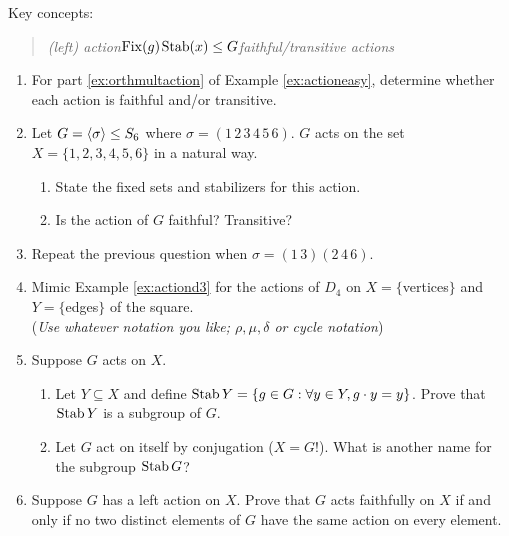 

\begin{exercises}{}{}
	Key concepts:
	\begin{quote}
		\emph{(left) action\quad $\operatorname{Fix}(g)$\quad $\operatorname{Stab}(x)\le G$\quad faithful/transitive actions}
	\end{quote}
	
	\begin{enumerate}
	  \item For part \ref*{ex:orthmultaction} of Example \ref{ex:actioneasy}, determine whether each action is faithful and/or transitive.
	
		
		\item\label{exs:orbitsigma1} Let $G=\left\langle \sigma\right\rangle\le S_6$ where $\sigma=(1\,2\,3\,4\,5\,6)$. $G$ acts on the set $X=\{1,2,3,4,5,6\}$ in a natural way.
		\begin{enumerate}
		  \item State the fixed sets and stabilizers for this action.
		  \item Is the action of $G$ faithful? Transitive?
		\end{enumerate}
		
		
		\item\label{exs:orbitsigma2} Repeat the previous question when $\sigma=(1\,3)(2\,4\,6)$.
		
	
		\item Mimic Example \ref{ex:actiond3} for the actions of $D_4$ on $X=\{$vertices$\}$ and $Y=\{$edges$\}$ of the square.\\
		(\emph{Use whatever notation you like; $\rho,\mu,\delta$ or cycle notation})
	
	
		\item Suppose $G$ acts on $X$.
		\begin{enumerate}
		  \item Let $Y\subseteq X$ and define $\operatorname{Stab} Y=\{g\in G:\forall y\in Y, g\cdot y=y\}$. Prove that $\operatorname{Stab} Y$ is a subgroup of $G$.
			\item Let $G$ act on itself by conjugation ($X=G$!). What is another name for the subgroup $\operatorname{Stab} G$?
		\end{enumerate}
		
	
		\item Suppose $G$ has a left action on $X$. Prove that $G$ acts faithfully on $X$ if and only if no two distinct elements of $G$ have the same action on every element.
	
	\end{enumerate}
\end{exercises}

